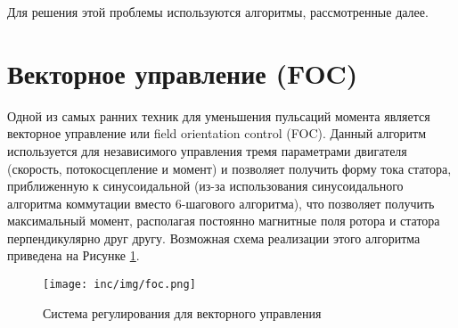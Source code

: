 Для решения этой проблемы используются алгоритмы, рассмотренные далее.

\section{Векторное управление (FOC)}
\label{sec:foc}

Одной из самых ранних техник для уменьшения пульсаций момента является векторное управление или field orientation control (FOC). Данный алгоритм используется для независимого управления тремя параметрами двигателя (скорость, потокосцепление и момент) и позволяет получить форму тока статора, приближенную к синусоидальной (из-за использования синусоидального алгоритма коммутации вместо 6-шагового алгоритма), что позволяет получить максимальный момент, располагая постоянно магнитные поля ротора и статора перпендикулярно друг другу. Возможная схема реализации этого алгоритма приведена на Рисунке \ref{pic:foc}.

\begin{figure}[!h]
\centering
\texttt{[image: inc/img/foc.png]}
\caption{Система регулирования для векторного управления \cite{art:bdlc_adv_control_techs}}
\label{pic:foc}
\end{figure}

